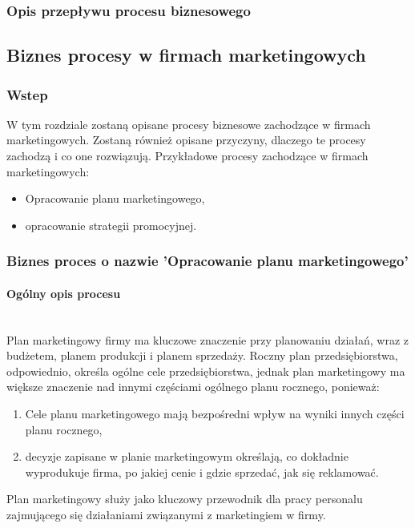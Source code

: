 \documentclass[a4paper, 12pt]{article}
\begin{document}
\subsubsection{Opis przepływu procesu biznesowego}






\subsection{Biznes procesy w firmach marketingowych}
\subsubsection{Wstep}
\hspace*{1 cm} W tym rozdziale zostaną opisane procesy biznesowe zachodzące w firmach marketingowych. Zostaną również opisane przyczyny, dlaczego te procesy zachodzą i co one rozwiązują. Przykładowe procesy zachodzące w firmach marketingowych:
\begin{itemize}
	\item Opracowanie planu marketingowego,
	\item opracowanie strategii promocyjnej.
\end{itemize}
\subsubsection{Biznes proces o nazwie 'Opracowanie planu marketingowego'}
\paragraph{Ogólny opis procesu}\mbox{}\\
\hspace*{1 cm}Plan marketingowy firmy ma kluczowe znaczenie przy planowaniu działań, wraz z budżetem, planem produkcji i planem sprzedaży. Roczny plan przedsiębiorstwa, odpowiednio, określa ogólne cele przedsiębiorstwa, jednak plan marketingowy ma większe znaczenie nad innymi częściami ogólnego planu rocznego, ponieważ:
\begin{enumerate}
	\item Cele planu marketingowego mają bezpośredni wpływ na wyniki innych części planu rocznego,
	\item decyzje zapisane w planie marketingowym określają, co dokładnie wyprodukuje firma, po jakiej cenie i gdzie sprzedać, jak się reklamować.
\end{enumerate}
\hspace*{1 cm}Plan marketingowy służy jako kluczowy przewodnik dla pracy personalu zajmującego się działaniami związanymi z marketingiem w firmy.
\end{document}
